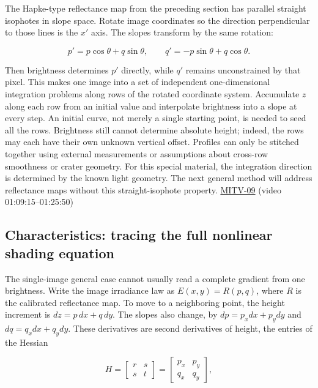 \hypertarget{04-visual-computing-ii-ch032-shape-from-one-shading-image-when-isophotes-are-straight}{}

The Hapke-type reflectance map from the preceding section has parallel straight isophotes in slope space. Rotate image coordinates so the direction perpendicular to those lines is the \(x'\) axis. The slopes transform by the same rotation:

\[
p'=p\cos\theta+q\sin\theta,\qquad q'=-p\sin\theta+q\cos\theta.
\]

Then brightness determines \(p'\) directly, while \(q'\) remains unconstrained by that pixel. This makes one image into a set of independent one-dimensional integration problems along rows of the rotated coordinate system. Accumulate \(z\) along each row from an initial value and interpolate brightness into a slope at every step. An initial curve, not merely a single starting point, is needed to seed all the rows. Brightness still cannot determine absolute height; indeed, the rows may each have their own unknown vertical offset. Profiles can only be stitched together using external measurements or assumptions about cross-row smoothness or crater geometry. For this special material, the integration direction is determined by the known light geometry. The next general method will address reflectance maps without this straight-isophote property. \hyperref[04-visual-computing-ii-ch036-mitv-09---shape-from-shading-general-case---from-first-order-nonlinear-pde-to-five-odes]{MITV-09} (video 01:09:15--01:25:50)

\subsection{Characteristics: tracing the full nonlinear shading equation}\label{04-visual-computing-ii-ch032-characteristics-tracing-the-full-nonlinear-shading-equation}

\hypertarget{04-visual-computing-ii-ch032-characteristics-tracing-the-full-nonlinear-shading-equation}{}

The single-image general case cannot usually read a complete gradient from one brightness. Write the image irradiance law as \(E(x,y)=R(p,q)\), where \(R\) is the calibrated reflectance map. To move to a neighboring point, the height increment is \(dz=p\,dx+q\,dy\). The slopes also change, by \(dp=p_xdx+p_ydy\) and \(dq=q_xdx+q_ydy\). These derivatives are second derivatives of height, the entries of the Hessian

\[
H=\begin{bmatrix}r&s\\s&t\end{bmatrix}=\begin{bmatrix}p_x&p_y\\q_x&q_y\end{bmatrix},
\]

